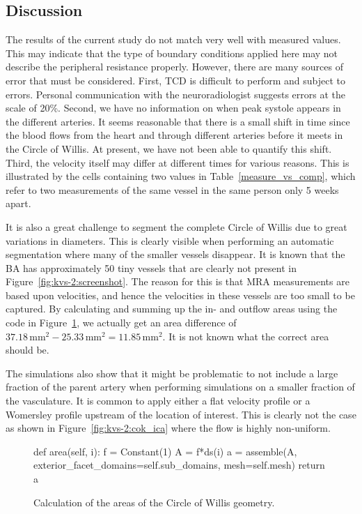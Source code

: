 \subsection{Discussion}

The results of the current study do not match very well with measured
values. This may indicate that the type of boundary conditions applied
here may not describe the peripheral resistance properly. However,
there are many sources of error that must be considered.  First, TCD
is difficult to perform and subject to errors. Personal communication
with the neuroradiologist suggests errors at the scale of 20\%.
Second, we have no information on when peak systole appears in the
different arteries. It seems reasonable that there is a small shift in
time since the blood flows from the heart and through different
arteries before it meets in the Circle of Willis. At present, we have not been able to
quantify this shift. Third, the velocity itself may differ at
different times for various reasons. This is illustrated by the cells
containing two values in Table~\ref{measure_vs_comp}, which refer to
two measurements of the same vessel in the same person only 5 weeks
apart.

It is also a great challenge to segment the complete Circle of Willis due to great
variations in diameters. This is clearly visible when performing an
automatic segmentation where many of the smaller vessels disappear.
It is known that the BA has approximately 50 tiny vessels that are
clearly not present in Figure~\ref{fig:kvs-2:screenshot}. The reason
for this is that MRA measurements are based upon velocities, and hence
the velocities in these vessels are too small to be captured. By
calculating and summing up the in- and outflow areas using the code in
Figure~\ref{fig:kvs-2:area_code}, we actually get an area difference
of
$37.18\,\mathrm{mm}^2-25.33\,\mathrm{mm}^2=11.85\,\mathrm{mm}^2$. It
is not known what the correct area should be.

The simulations also show that it might be problematic to not include
a large fraction of the parent artery when performing simulations on a
smaller fraction of the vasculature. It is common to apply either a
flat velocity profile or a Womersley profile upstream of the location
of interest. This is clearly not the case as shown in
Figure~\ref{fig:kvs-2:cok_ica} where the flow is highly non-uniform.

\begin{figure}
\bwfig
\begin{python}
def area(self, i):
    f = Constant(1)
    A = f*ds(i)
    a = assemble(A,
                 exterior_facet_domains=self.sub_domains,
                 mesh=self.mesh)
    return a
\end{python}
\caption{Calculation of the areas of the Circle of Willis geometry.}
\label{fig:kvs-2:area_code}
\end{figure}

